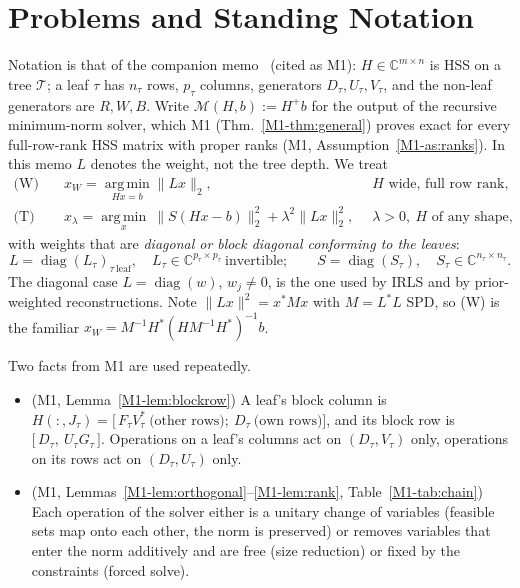 \section{Problems and Standing Notation}\label{sec:problems}

Notation is that of the companion memo~\cite{memo1} (cited as M1): $H\in\mathbb{C}^{m\times n}$ is HSS on a
tree $\mathcal T$; a leaf $\tau$ has $n_\tau$ rows, $p_\tau$ columns, generators
$D_\tau,U_\tau,V_\tau$, and the non-leaf generators are $R,W,B$. Write
$\mathcal M(H,b):=H^+b$ for the output of the recursive minimum-norm solver, which M1
(Thm.~\ref{M1-thm:general}) proves exact for every full-row-rank HSS matrix with proper ranks
(M1, Assumption~\ref{M1-as:ranks}). In this memo $L$ denotes the weight, not the tree depth. We treat
\begin{align}
\text{(W)}\quad & x_W=\operatorname*{arg\,min}_{Hx=b}\|Lx\|_2, && H \text{ wide, full row rank},\label{eq:W}\\
\text{(T)}\quad & x_\lambda=\operatorname*{arg\,min}_{x}\ \|S(Hx-b)\|_2^2+\lambda^2\|Lx\|_2^2, && \lambda>0,\ H\text{ of any shape},\label{eq:T}
\end{align}
with weights that are \emph{diagonal or block diagonal conforming to the leaves}:
\[
L=\operatorname{diag}(L_\tau)_{\tau\ \text{leaf}},\quad L_\tau\in\mathbb{C}^{p_\tau\times p_\tau}\ \text{invertible};\qquad
S=\operatorname{diag}(S_\tau),\quad S_\tau\in\mathbb{C}^{n_\tau\times n_\tau}.
\]
The diagonal case $L=\operatorname{diag}(w)$, $w_j\neq0$, is the one used by IRLS and by
prior-weighted reconstructions. Note $\|Lx\|^2=x^*Mx$ with $M=L^*L$ SPD, so (W) is the familiar
$x_W=M^{-1}H^*(HM^{-1}H^*)^{-1}b$.

Two facts from M1 are used repeatedly.
\begin{itemize}[leftmargin=1.4em,itemsep=1pt]
\item[(F1)] (M1, Lemma~\ref{M1-lem:blockrow}) A leaf's block column is $H(:,J_\tau)=\big[\,F_\tau V_\tau^*\ \text{(other rows)};\ D_\tau\ \text{(own rows)}\big]$,
and its block row is $\big[\,D_\tau,\ U_\tau G_\tau\,\big]$. Operations on a leaf's columns act on
$(D_\tau,V_\tau)$ only, operations on its rows act on $(D_\tau,U_\tau)$ only.
\item[(F2)] (M1, Lemmas~\ref{M1-lem:orthogonal}--\ref{M1-lem:rank}, Table~\ref{M1-tab:chain}) Each operation of the solver either is a unitary
change of variables (feasible sets map onto each other, the norm is preserved) or removes variables
that enter the norm additively and are free (size reduction) or fixed by the constraints (forced
solve).
\end{itemize}

